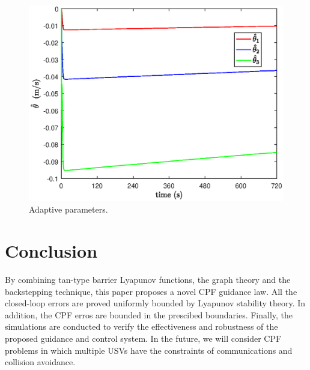 \documentclass[a4paper,fleqn]{cas-dc}
\begin{document}
\begin{figure}[!htb]
	\centering
	\includegraphics[width=\hsize]{AdaptiveParam.eps}
	\caption{Adaptive parameters.}
	\label{fig11}
\end{figure}



\section{Conclusion}

By combining tan-type barrier Lyapunov functions, the graph theory and the backstepping technique, this paper proposes a novel CPF guidance law. All the closed-loop errors are proved uniformly bounded by Lyapunov stability theory. In addition, the CPF erros are bounded in the prescibed boundaries. Finally, the simulations are conducted to verify the effectiveness and robustness of the proposed guidance and control system. In the future, we will consider CPF problems in which multiple USVs have the constraints of communications and collision avoidance. 

%
\end{document}

